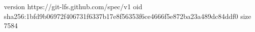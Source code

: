 version https://git-lfs.github.com/spec/v1
oid sha256:1bfd9b06972f406731f6337b17e8f56353f6ce4666f5e872ba23a489dc84ddf0
size 7584
